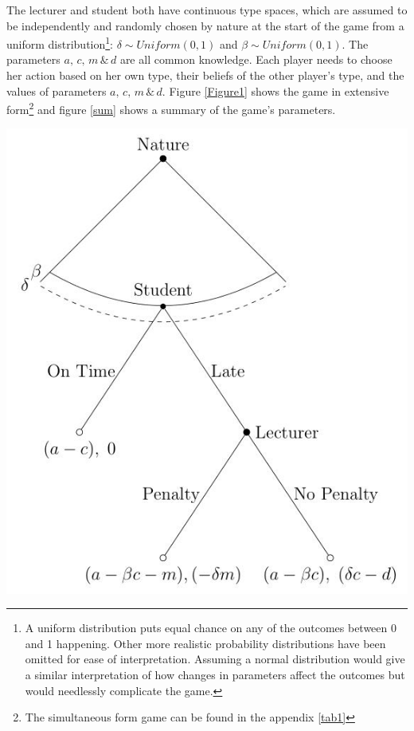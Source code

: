 \documentclass[11pt,preprint, authoryear]{elsarticle}
\numberwithin{equation}{section}
\numberwithin{figure}{section}
\numberwithin{table}{section}
\let\rmarkdownfootnote\footnote%
\def\footnote{\protect\rmarkdownfootnote}
\begin{document}
The lecturer and student both have continuous type spaces, which are
assumed to be independently and randomly chosen by nature at the start
of the game from a uniform distribution\footnote{A uniform distribution
  puts equal chance on any of the outcomes between 0 and 1 happening.
  Other more realistic probability distributions have been omitted for
  ease of interpretation. Assuming a normal distribution would give a
  similar interpretation of how changes in parameters affect the
  outcomes but would needlessly complicate the game.}:
\(\delta \sim Uniform(0,1)\) and \(\beta \sim Uniform(0,1)\). The
parameters \(a,\, c,\, m\, \&\, d\) are all common knowledge. Each
player needs to choose her action based on her own type, their beliefs
of the other player's type, and the values of parameters
\(a,\, c,\, m\, \&\, d\). Figure \ref{Figure1} shows the game in
extensive form\footnote{The simultaneous form game can be found in the
  appendix \ref{tab1}} and figure \ref{sum} shows a summary of the
game's parameters.

\begin{center}
\includegraphics[scale=1]{"img/continuous.jpg"}
\label{Figure1}
\end{center}
\end{document}
